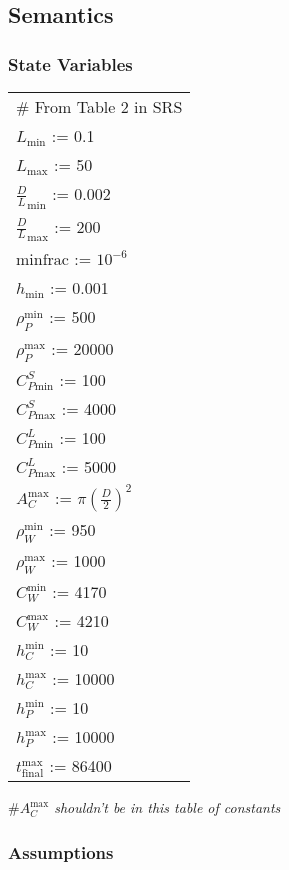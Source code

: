 \documentclass[12pt, titlepage]{article}
\begin{document}
\subsection{Semantics}

\subsubsection{State Variables}

\renewcommand{\arraystretch}{1.2}
\begin{longtable*}[l]{l} 
\# From Table 2 in SRS\\
  $L_\text{min}$ := 0.1\\
  $L_\text{max}$ := 50\\
  ${\frac{D}{L}}_\text{min}$ := 0.002 \\
  ${\frac{D}{L}}_\text{max}$ := 200 \\
  $\text{minfrac} $ := $10^{-6}$\\
  $h_\text{min}$ := 0.001 \\
  $\rho_P^{\text{min}}$ := 500\\
  $\rho_P^{\text{max}}$ := 20000\\
  $C_{P\text{min}}^S$ := 100 \\
  $C_{P\text{max}}^S$ := 4000\\
  $C_{P\text{min}}^L$ := 100 \\
  $C_{P\text{max}}^L$ := 5000\\
  $A_C^{\text{max}}$ := $\pi(\frac{D}{2})^2$\\
  $\rho_W^{\text{min}}$ := 950\\
  $\rho_W^{\text{max}}$ := 1000\\
  $C_W^{\text{min}}$ := 4170\\
  $C_W^{\text{max}}$ := 4210\\
  $h_C^{\text{min}}$ := 10\\
  $h_C^{\text{max}}$ := 10000\\
  $h_P^{\text{min}}$ := 10\\
  $h_P^{\text{max}}$ := 10000\\
  $t_{\text{final}}^{\text{max}}$ := 86400\\
\end{longtable*}

\#\textit{$A_C^{\text{max}}$ shouldn't be in this table of constants}

\subsubsection{Assumptions}
\end{document}
